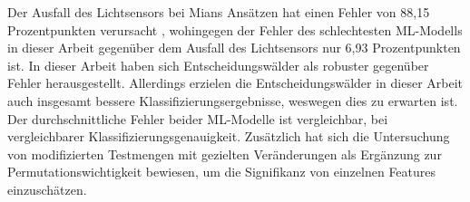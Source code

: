 Der Ausfall des Lichtsensors bei Mians Ansätzen hat einen Fehler von 88,15 Prozentpunkten verursacht \cite{naveedThesis},
wohingegen der Fehler des schlechtesten ML-Modells in dieser Arbeit gegenüber dem Ausfall des Lichtsensors nur 6,93 Prozentpunkten ist.
\newline
\newline
In dieser Arbeit haben sich Entscheidungswälder als robuster gegenüber Fehler herausgestellt.
Allerdings erzielen die Entscheidungswälder in dieser Arbeit auch insgesamt bessere Klassifizierungsergebnisse, weswegen dies zu erwarten ist.
Der durchschnittliche Fehler beider ML-Modelle ist vergleichbar, bei vergleichbarer Klassifizierungsgenauigkeit.
Zusätzlich hat sich die Untersuchung von modifizierten Testmengen mit gezielten Veränderungen als Ergänzung zur Permutationswichtigkeit bewiesen,
um die Signifikanz von einzelnen Features einzuschätzen.